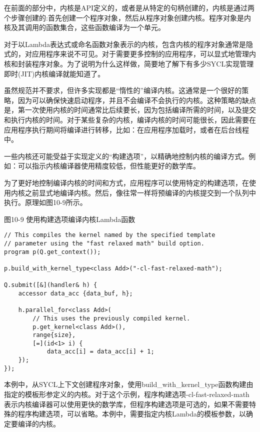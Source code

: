 在前面的部分中，内核是API定义的，或者是从特定的句柄创建的，内核是通过两个步骤创建的:首先创建一个程序对象，然后从程序对象创建内核。程序对象是内核及其调用的函数集合，这些函数编译为一个单元。\par

对于以Lambda表达式或命名函数对象表示的内核，包含内核的程序对象通常是隐式的，对应用程序来说不可见。对于需要更多控制的应用程序，可以显式地管理内核和封装程序对象。为了说明为什么这样做，简要地了解下有多少SYCL实现管理即时(JIT)内核编译就能知道了。\par

虽然规范并不要求，但许多实现都是“惰性的”编译内核。这通常是一个很好的策略，因为可以确保快速启动程序，并且不会编译不会执行的内核。这种策略的缺点是，第一次使用内核的时间通常比后续要长，因为包括编译所需的时间，以及提交和执行内核的时间。对于某些复杂的内核，编译内核的时间可能很长，因此需要在应用程序执行期间将编译进行转移，比如：在应用程序加载时，或者在后台线程中。\par

一些内核还可能受益于实现定义的“构建选项”，以精确地控制内核的编译方式。例如：可以指示内核编译器使用精度较低，但性能更好的数学库。\par

为了更好地控制编译内核的时间和方式，应用程序可以使用特定的构建选项，在使用内核之前显式地编译内核。然后，像往常一样将预编译的内核提交到一个队列中执行。原理如图10-9所示。\par

\hspace*{\fill} \par %
图10-9 使用构建选项编译内核Lambda函数
\begin{lstlisting}[caption={}]
// This compiles the kernel named by the specified template
// parameter using the "fast relaxed math" build option.
program p(Q.get_context());

p.build_with_kernel_type<class Add>("-cl-fast-relaxed-math");

Q.submit([&](handler& h) {
	accessor data_acc {data_buf, h};
	
	h.parallel_for<class Add>(
		// This uses the previously compiled kernel.
		p.get_kernel<class Add>(),
		range{size},
		[=](id<1> i) {
			data_acc[i] = data_acc[i] + 1;
	});
});
\end{lstlisting}

本例中，从SYCL上下文创建程序对象，使用build\_with\_kernel\_type函数构建由指定的模板形参定义的内核。对于这个示例，程序构建选项-cl-fast-relaxed-math表示内核编译器可以使用更快的数学库，但程序构建选项是可选的，如果不需要特殊的程序构建选项，可以省略。本例中，需要指定内核Lambda的模板参数，以确定要编译的内核。\par

